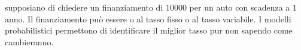 \begin{esempio}
    supposiano di chiedere un finanziamento di $10000$ per un auto con scadenza 
    a $1$ anno. Il finanziamento può essere o al tasso fisso o al tasso variabile.
    I modelli probabilistici permettono di identificare il miglior tasso pur non 
    sapendo come cambieranno.
\end{esempio}

